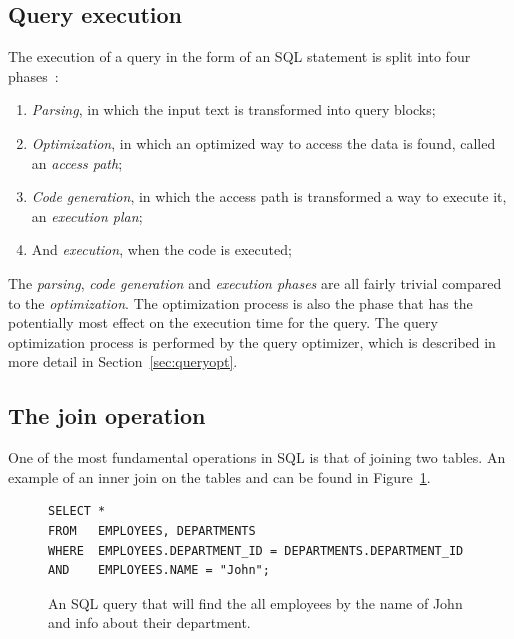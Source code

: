 \subsection{Query execution}
The execution of a query in the form of an SQL statement is split into four phases~\cite{selinger_1979_access_apsiardms}:
\begin{enumerate}
    \item \textit{Parsing}, in which the input text is transformed into query blocks;
    \item \textit{Optimization}, in which an optimized way to access the data is found, called an \textit{access path};
    \item \textit{Code generation}, in which the access path is transformed a way to execute it, an \textit{execution plan};
    \item And \textit{execution}, when the code is executed;
\end{enumerate}

The \textit{parsing}, \textit{code generation} and \textit{execution phases} are
all fairly trivial compared to the \textit{optimization}. The optimization
process is also the phase that has the potentially most effect on the execution
time for the query. The query optimization process is performed by the query
optimizer, which is described in more detail in Section~\ref{sec:queryopt}.

\subsection{The join operation}
One of the most fundamental operations in SQL is that of joining two tables. An
example of an inner join on the tables  and  can
be found in Figure~\ref{fig:sql:joinop}.

\begin{figure}[ht]
\begin{verbatim}
SELECT *
FROM   EMPLOYEES, DEPARTMENTS
WHERE  EMPLOYEES.DEPARTMENT_ID = DEPARTMENTS.DEPARTMENT_ID
AND    EMPLOYEES.NAME = "John";
\end{verbatim}
\caption[An example of an SQL query]{An SQL query that will find the all employees by the name of John and info about their department.}\label{fig:sql:joinop}
\end{figure}

